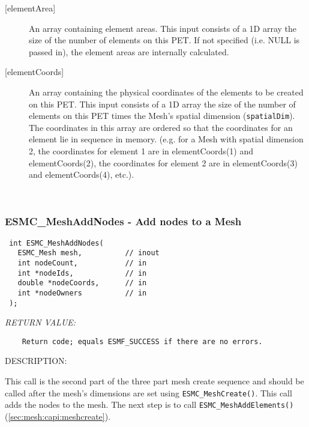 \begin{description}
     \item [{[elementArea]}]
            An array containing element areas.  This input consists of a 1D array
            the size of the number of elements on this PET. If not specified (i.e. NULL is passed in), the
            element areas are internally calculated.
     \item[{[elementCoords]}]
            An array containing the physical coordinates of the elements to be created on this
            PET. This input consists of a 1D array the size of the number of elements on this PET times the Mesh's
            spatial dimension ({\tt spatialDim}). The coordinates in this array are ordered
            so that the coordinates for an element lie in sequence in memory. (e.g. for a
            Mesh with spatial dimension 2, the coordinates for element 1 are in elementCoords(1) and
            elementCoords(2), the coordinates for element 2 are in elementCoords(3) and elementCoords(4),
            etc.).
  
     \end{description}
   
 
\mbox{}\hrulefill\ 
 
\subsubsection [ESMC\_MeshAddNodes] {ESMC\_MeshAddNodes - Add nodes to a Mesh \label{sec:mesh:capi:meshaddnodes}}


  
\begin{verbatim} int ESMC_MeshAddNodes(
   ESMC_Mesh mesh,          // inout
   int nodeCount,           // in
   int *nodeIds,            // in
   double *nodeCoords,      // in
   int *nodeOwners          // in
 );
 \end{verbatim}{\em RETURN VALUE:}
\begin{verbatim}    Return code; equals ESMF_SUCCESS if there are no errors.\end{verbatim}
{\sf DESCRIPTION:\\ }


     This call is the second part of the three part mesh create
     sequence and should be called after the mesh's dimensions are set
     using {\tt ESMC\_MeshCreate()}.
     This call adds the nodes to the
     mesh. The next step is to call {\tt ESMC\_MeshAddElements()} (\ref{sec:mesh:capi:meshcreate}).
  
